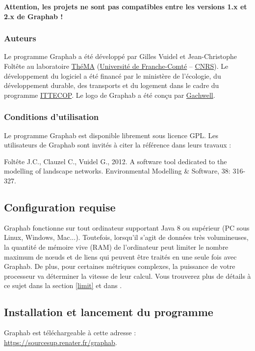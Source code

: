 \documentclass{article}
\begin{document}
\textbf{Attention, les projets ne sont pas compatibles entre les versions 1.x et 2.x de Graphab !}

\subsubsection{Auteurs}
Le programme Graphab a été développé par Gilles Vuidel et Jean-Christophe Foltête au laboratoire \href{http://thema.univ-fcomte.fr}{ThéMA} (\href{http://www.univ-fcomte.fr}{Université de Franche-Comté} – \href{http://www.cnrs.fr}{CNRS}). Le développement du logiciel a été financé par le ministère de l'écologie, du développement durable, des transports et du logement dans le cadre du programme \href{http://www.ittecop.fr/}{ITTECOP}. Le logo de Graphab a été conçu par \href{http://www.gachwell.com/}{Gachwell}. 

\subsubsection{Conditions d’utilisation}
Le programme Graphab est disponible librement sous licence GPL. Les utilisateurs de Graphab sont invités à citer la référence \cite{2012_graphab_EMS} dans leurs travaux :

Foltête J.C., Clauzel C., Vuidel G., 2012. A software tool dedicated to the modelling of landscape networks. Environmental Modelling \& Software, 38: 316-327.


\subsection{Configuration requise}

Graphab fonctionne sur tout ordinateur supportant Java 8 ou supérieur (PC sous Linux, Windows, Mac...). Toutefois, lorsqu'il s'agit de données très volumineuses, la quantité de mémoire vive (RAM) de l’ordinateur peut limiter le nombre maximum de nœuds et de liens qui peuvent être traités en une seule fois avec Graphab. De plus, pour certaines métriques complexes, la puissance de votre processeur va déterminer la vitesse de leur calcul. Vous trouverez plus de détails à ce sujet dans la section \ref{limit} et dans \cite{2012_graphab_EMS}.

\subsection{Installation et lancement du programme}

Graphab est téléchargeable à cette adresse : \url{https://sourcesup.renater.fr/graphab}.
\end{document}
